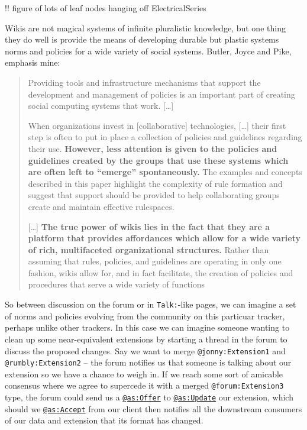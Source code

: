\documentclass[notoc]{tufte-book}
\begin{document}
!! figure of lots of leaf nodes hanging off ElectricalSeries

Wikis are not magical systems of infinite pluralistic knowledge, but one
thing they do well is provide the means of developing durable but
plastic systems norms and policies for a wide variety of social systems.
Butler, Joyce and Pike, emphasis mine:

\begin{quote}
Providing tools and infrastructure mechanisms that support the
development and management of policies is an important part of creating
social computing systems that work. {[}\ldots{]}

When organizations invest in {[}collaborative{]} technologies,
{[}\ldots{]} their first step is often to put in place a collection of
policies and guidelines regarding their use. \textbf{However, less
attention is given to the policies and guidelines created by the groups
that use these systems which are often left to ``emerge''
spontaneously.} The examples and concepts described in this paper
highlight the complexity of rule formation and suggest that support
should be provided to help collaborating groups create and maintain
effective rulespaces.

{[}\ldots{]} \textbf{The true power of wikis lies in the fact that they
are a platform that provides affordances which allow for a wide variety
of rich, multifaceted organizational structures.} Rather than assuming
that rules, policies, and guidelines are operating in only one fashion,
wikis allow for, and in fact facilitate, the creation of policies and
procedures that serve a wide variety of functions \citep{butlerDonLookNow2008} 
\end{quote}

So between discussion on the forum or in \texttt{Talk:}-like pages, we
can imagine a set of norms and policies evolving from the community on
this particuar tracker, perhaps unlike other trackers. In this case we
can imagine someone wanting to clean up some near-equivalent extensions
by starting a thread in the forum to discuss the proposed changes. Say
we want to merge \texttt{@jonny:Extension1} and
\texttt{@rumbly:Extension2} -- the forum notifies us that someone is
talking about our extension so we have a chance to weigh in. If we reach
some sort of amicable consensus where we agree to supercede it with a
merged \texttt{@forum:Extension3} type, the forum could send us a
\href{https://www.w3.org/TR/activitystreams-vocabulary/\#dfn-offer}{\texttt{@as:Offer}}
to
\href{https://www.w3.org/TR/activitystreams-vocabulary/\#dfn-update}{\texttt{@as:Update}}
our extension, which should we
\href{https://www.w3.org/TR/activitystreams-vocabulary/\#dfn-accept}{\texttt{@as:Accept}}
from our client then notifies all the downstream consumers of our data
and extension that its format has changed.
\end{document}
